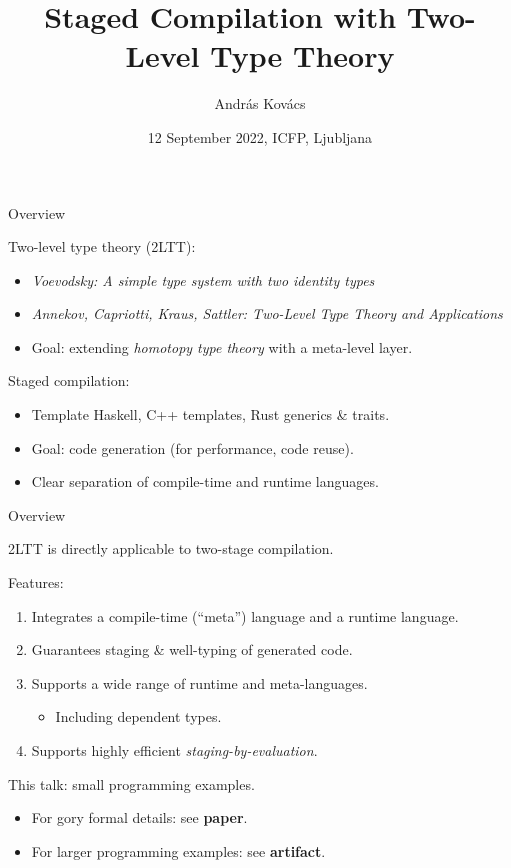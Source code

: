 \documentclass[dvipsnames,aspectratio=169]{beamer}
\title{Staged Compilation with Two-Level Type Theory}
\author{András Kovács}
\institute{
  {Eötvös Loránd University}
}
\date{12 September 2022, ICFP, Ljubljana}
\theoremstyle{remark}
\begin{document}
\frame{\titlepage}

\begin{frame}{Overview}

Two-level type theory (2LTT):
\begin{itemize}
  \item \emph{Voevodsky: A simple type system with two identity types}
  \item \emph{Annekov, Capriotti, Kraus, Sattler: Two-Level Type Theory and Applications}
  \item Goal: extending \emph{homotopy type theory} with a meta-level layer.
\end{itemize}
\vspace{1em}
\pause

Staged compilation:
\begin{itemize}
  \item Template Haskell, C++ templates, Rust generics \& traits.
  \item Goal: code generation (for performance, code reuse).
  \item Clear separation of compile-time and runtime languages.
\end{itemize}
\vspace{1em}

\end{frame}

\begin{frame}{Overview}

2LTT is directly applicable to two-stage compilation.
\vspace{1em}
\pause

Features:
\begin{enumerate}
\item Integrates a compile-time (``meta'') language and a runtime language.
\pause
\item Guarantees staging \& well-typing of generated code.
\pause
\item Supports a wide range of runtime and meta-languages.
  \begin{itemize}
  \pause
  \item \alert{Including dependent types}.
  \end{itemize}
\pause
\item Supports highly efficient \emph{staging-by-evaluation}.
\end{enumerate}
\vspace{1em}
\pause

This talk: \alert{small programming examples}.
\begin{itemize}
  \item For gory formal details: see \textbf{paper}.
  \item For larger programming examples: see \textbf{artifact}.
\end{itemize}


\end{frame}
\end{document}
